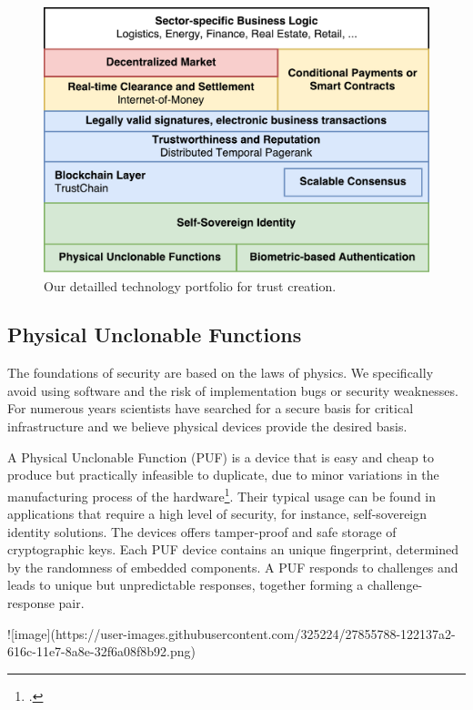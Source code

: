 \documentclass[USenglish]{article}
\begin{document}
\begin{figure}[t]
	\centering
	\includegraphics[width=1\columnwidth]{assets/tech_stack}
	\caption{Our detailled technology portfolio for trust creation.}
	\label{fig:tech_stack}
\end{figure}

\subsection{Physical Unclonable Functions}

The foundations of security are based on the laws of physics.
We specifically avoid using software and the risk of implementation bugs or security weaknesses.
For numerous years scientists have searched for a secure basis for critical infrastructure and we believe physical devices provide the desired basis.

A Physical Unclonable Function (PUF) is a device that is easy and cheap to produce but practically infeasible to duplicate, due to minor variations in the manufacturing process of the hardware\footcite{cortez2012modeling}.
Their typical usage can be found in applications that require a high level of security, for instance, self-sovereign identity solutions.
The devices offers tamper-proof and safe storage of cryptographic keys.
Each PUF device contains an unique fingerprint, determined by the randomness of embedded components.
A PUF responds to challenges and leads to unique but unpredictable responses, together forming a challenge-response pair.

![image](https://user-images.githubusercontent.com/325224/27855788-122137a2-616c-11e7-8a8e-32f6a08f8b92.png)
\end{document}
